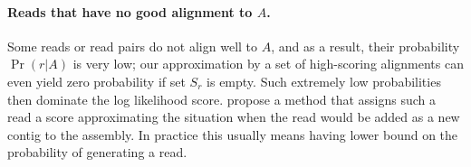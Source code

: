 \paragraph{Reads that have no good alignment to $A$.}
Some reads or read pairs do not align well to $A$, and as a result, their
probability $\Pr(r|A)$ is very low; our approximation by a set of
high-scoring alignments can even yield zero probability if set $S_r$
is empty.  Such extremely low probabilities then dominate the log
likelihood score.  \cite{Ghodsi2013} propose a method that assigns
such a read a score approximating the situation when the read would be
added as a new contig to the assembly. In practice this usually
means having lower bound on the probability of generating a read.
